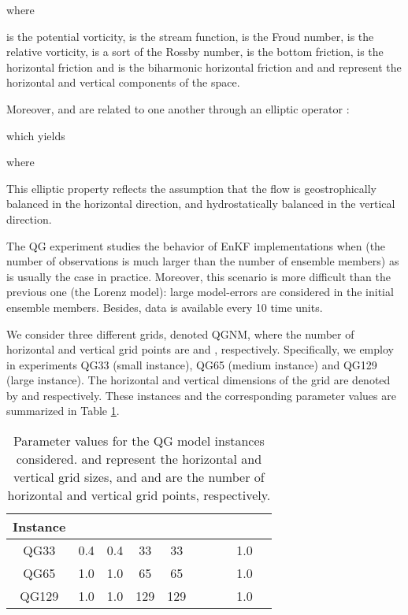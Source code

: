 \documentclass[12pt]{article}
\begin{document}
\label{Results:QG-Model}

where 

 is the potential vorticity,  is the stream function,  is the Froud number,  is the relative vorticity,  is a sort of the Rossby number,  is the bottom friction,  is the horizontal friction and  is the biharmonic horizontal friction and  and  represent the horizontal and vertical components of the space.

Moreover,  and  are related to one another through an elliptic operator \cite{Pedl96}:

which yields 

where 


This elliptic property reflects the assumption that the flow is geostrophically balanced in the horizontal direction, and hydrostatically balanced in the vertical direction.

The QG experiment studies the behavior of EnKF implementations when  (the number of observations is much larger than the number of ensemble members) as is usually the case in practice. Moreover, this scenario is more difficult than the previous one (the Lorenz model): large model-errors are considered in the initial ensemble members. Besides, data is available every 10 time units. 

We consider three different grids, denoted QGNM, where the number of horizontal and vertical grid points are  and , respectively. Specifically, we employ in experiments QG33 (small instance),  QG65 (medium instance) and QG129 (large instance). The horizontal and vertical dimensions of the grid are denoted by  and  respectively.  These instances and the corresponding parameter values are summarized in Table  \ref{Tab:QG-Instances}.
\begin{table}[H]
\centering
{ \footnotesize
\begin{tabular}{|c|c|c|c|c|c|c|c|c|c|} \hline
Instance &  &  &  &  &  &  &  &  &  \\ \hline
QG33 & 0.4 & 0.4 & 33 & 33 &  &  &  & 1.0 &  \\ \hline
QG65 & 1.0 & 1.0 & 65 & 65 &  &  &  & 1.0 &   \\ \hline
QG129 & 1.0 & 1.0 & 129 & 129 &  &  &  & 1.0 &   \\ \hline
\end{tabular}
}
\caption{Parameter values for the QG model instances considered.  and  represent the horizontal and vertical grid sizes, and  and  are the number of horizontal and vertical grid points, respectively.}
\label{Tab:QG-Instances}
\end{table}
\end{document}

